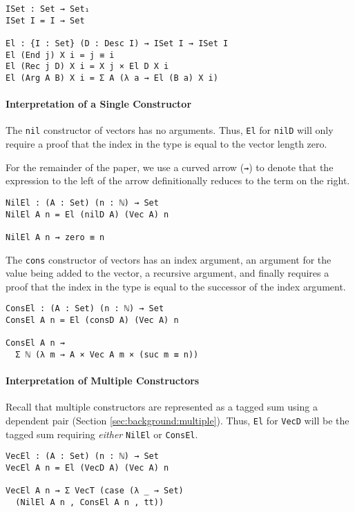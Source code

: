 \documentclass[nonatbib]{sigplanconf}
\newcommand{\refsec}[1]{Section \ref{sec:#1}}
\begin{document}
\begin{verbatim}
ISet : Set → Set₁
ISet I = I → Set

El : {I : Set} (D : Desc I) → ISet I → ISet I
El (End j) X i = j ≡ i
El (Rec j D) X i = X j × El D X i
El (Arg A B) X i = Σ A (λ a → El (B a) X i)
\end{verbatim}

\paragraph{Interpretation of a Single Constructor}

The {\tt nil} constructor of vectors has no arguments. Thus,
{\tt El} for {\tt nilD} will only require a proof that the index in
the type is equal to the vector length zero.

For the remainder of the
paper, we use a curved arrow ({\tt ⇝}) to denote that the
expression to the left of the arrow definitionally reduces to the term
on the right.

\begin{verbatim}
NilEl : (A : Set) (n : ℕ) → Set
NilEl A n = El (nilD A) (Vec A) n

NilEl A n ⇝ zero ≡ n
\end{verbatim}

The {\tt cons} constructor of vectors has an index argument, an
argument for the value being added to the vector, a recursive
argument, and finally requires a proof that the index in the type is
equal to the successor of the index argument.

\begin{verbatim}
ConsEl : (A : Set) (n : ℕ) → Set
ConsEl A n = El (consD A) (Vec A) n

ConsEl A n ⇝
  Σ ℕ (λ m → A × Vec A m × (suc m ≡ n))
\end{verbatim}

\paragraph{Interpretation of Multiple Constructors}

Recall that multiple constructors are represented as a tagged sum
using a dependent pair (\refsec{background:multiple}). Thus,
{\tt El} for {\tt VecD} will be the tagged sum requiring
{\it either} {\tt NilEl} or {\tt ConsEl}.

\begin{verbatim}
VecEl : (A : Set) (n : ℕ) → Set
VecEl A n = El (VecD A) (Vec A) n

VecEl A n ⇝ Σ VecT (case (λ _ → Set)
  (NilEl A n , ConsEl A n , tt))
\end{verbatim}
\end{document}
